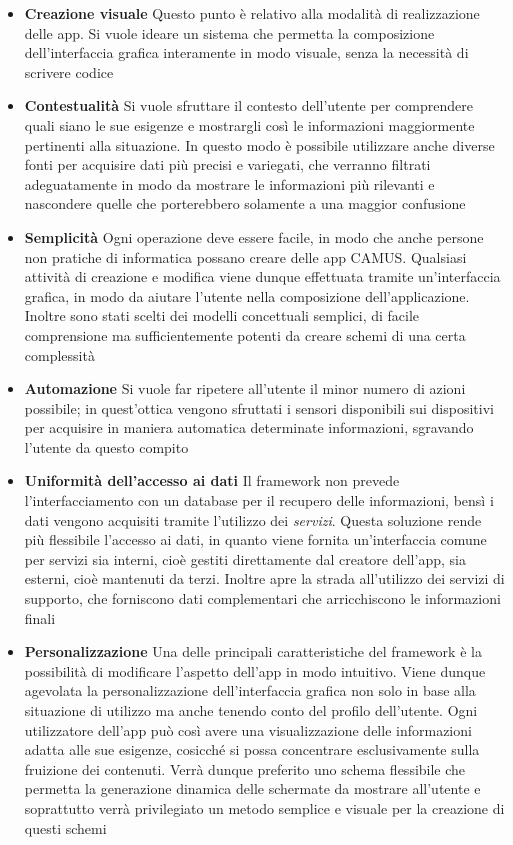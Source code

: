 \begin{itemize}
	\item \textbf{Creazione visuale}
	Questo punto è relativo alla modalità di realizzazione delle app. Si vuole ideare un sistema che permetta la composizione dell'interfaccia grafica interamente in modo visuale, senza la necessità di scrivere codice
	\item \textbf{Contestualità}
	Si vuole sfruttare il contesto dell'utente per comprendere quali siano le sue esigenze e mostrargli così le informazioni maggiormente pertinenti alla situazione. In questo modo è possibile utilizzare anche diverse fonti per acquisire dati più precisi e variegati, che verranno filtrati adeguatamente in modo da mostrare le informazioni più rilevanti e nascondere quelle che porterebbero solamente a una maggior confusione
	\item \textbf{Semplicità}
	Ogni operazione deve essere facile, in modo che anche persone non pratiche di informatica possano creare delle app CAMUS. Qualsiasi attività di creazione e modifica viene dunque effettuata tramite un'interfaccia grafica, in modo da aiutare l'utente nella composizione dell'applicazione. Inoltre sono stati scelti dei modelli concettuali semplici, di facile comprensione ma sufficientemente potenti da creare schemi di una certa complessità
	\item \textbf{Automazione}
	Si vuole far ripetere all'utente il minor numero di azioni possibile; in quest'ottica vengono sfruttati i sensori disponibili sui dispositivi per acquisire in maniera automatica determinate informazioni, sgravando l'utente da questo compito
	\item \textbf{Uniformità dell'accesso ai dati}
	Il framework non prevede l'interfacciamento con un database per il recupero delle informazioni, bensì i dati vengono acquisiti tramite l'utilizzo dei \emph{servizi}. Questa soluzione rende più flessibile l'accesso ai dati, in quanto viene fornita un'interfaccia comune per servizi sia interni, cioè gestiti direttamente dal creatore dell'app, sia esterni, cioè mantenuti da terzi. Inoltre apre la strada all'utilizzo dei servizi di supporto, che forniscono dati complementari che arricchiscono le informazioni finali
	\item \textbf{Personalizzazione}
	Una delle principali caratteristiche del framework è la possibilità di modificare l'aspetto dell'app in modo intuitivo. Viene dunque agevolata la personalizzazione dell'interfaccia grafica non solo in base alla situazione di utilizzo ma anche tenendo conto del profilo dell'utente. Ogni utilizzatore dell'app può così avere una visualizzazione delle informazioni adatta alle sue esigenze, cosicché si possa concentrare esclusivamente sulla fruizione dei contenuti. Verrà dunque preferito uno schema flessibile che permetta la generazione dinamica delle schermate da mostrare all'utente e soprattutto verrà privilegiato un metodo semplice e visuale per la creazione di questi schemi

\end{itemize}
